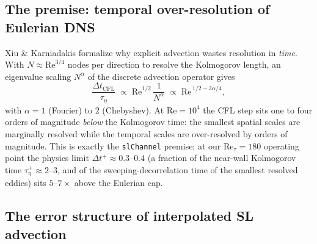\documentclass[11pt,a4paper]{article}
\newcommand{\Ret}{\mathrm{Re}_\tau}
\newcommand{\dtp}{\Delta t^{+}}
\begin{document}
\subsection{The premise: temporal over-resolution of Eulerian DNS}

Xiu \& Karniadakis \cite{xiu01} formalize why explicit advection wastes
resolution in \emph{time}. With $N\approx \mathrm{Re}^{3/4}$ nodes per
direction to resolve the Kolmogorov length, an eigenvalue scaling
$N^{\alpha}$ of the discrete advection operator gives
\begin{equation}
\frac{\Delta t_{\mathrm{CFL}}}{\tau_\eta}
\;\propto\; \mathrm{Re}^{1/2}\,\frac{1}{N^{\alpha}}
\;\propto\; \mathrm{Re}^{\,1/2-3\alpha/4},
\label{eq:overresolve}
\end{equation}
with $\alpha=1$ (Fourier) to $2$ (Chebyshev). At $\mathrm{Re}=10^4$ the CFL
step sits one to four orders of magnitude \emph{below} the Kolmogorov time:
the smallest spatial scales are marginally resolved while the temporal scales
are over-resolved by orders of magnitude. This is exactly the
\texttt{slChannel} premise; at our $\Ret=180$ operating point the physics
limit $\dtp\approx0.3$--$0.4$ (a fraction of the near-wall Kolmogorov time
$\tau_\eta^{+}\approx 2$--$3$, and of the sweeping-decorrelation time of the
smallest resolved eddies) sits $5$--$7\times$ above the Eulerian cap.

\subsection{The error structure of interpolated SL advection}
\end{document}

